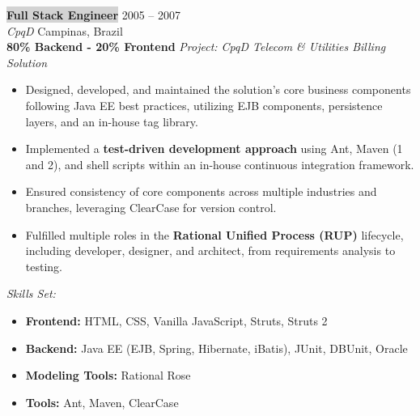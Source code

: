 \documentclass{resume} %
\begin{document}
\colorbox{lightgray}{\textbf{Full Stack Engineer}} \hfill 2005 -- 2007\\
\textit{CpqD} \hfill Campinas, Brazil\\
\textbf{80\% Backend - 20\% Frontend}  
\textit{Project: CpqD Telecom \& Utilities Billing Solution}  
\begin{itemize}
    \item Designed, developed, and maintained the solution's core business components following Java EE best practices, utilizing EJB components, persistence layers, and an in-house tag library.
    \item Implemented a \textbf{test-driven development approach} using Ant, Maven (1 and 2), and shell scripts within an in-house continuous integration framework.
    \item Ensured consistency of core components across multiple industries and branches, leveraging ClearCase for version control.
    \item Fulfilled multiple roles in the \textbf{Rational Unified Process (RUP)} lifecycle, including developer, designer, and architect, from requirements analysis to testing.
\end{itemize}

\textit{Skills Set:}  
\begin{itemize}
    \item \textbf{Frontend:} HTML, CSS, Vanilla JavaScript, Struts, Struts 2
    \item \textbf{Backend:} Java EE (EJB, Spring, Hibernate, iBatis), JUnit, DBUnit, Oracle
    \item \textbf{Modeling Tools:} Rational Rose
    \item \textbf{Tools:} Ant, Maven, ClearCase
\end{itemize}
\hfill \break
\end{document}
